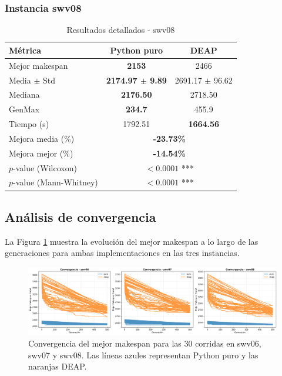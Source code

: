 \documentclass[12pt,a4paper]{article}
\begin{document}
\subsubsection{Instancia swv08}

\begin{table}[H]
\centering
\caption{Resultados detallados - swv08}
\label{tab:swv08}
\begin{tabular}{@{}lcc@{}}
\toprule
\textbf{Métrica} & \textbf{Python puro} & \textbf{DEAP} \\ \midrule
Mejor makespan & \textbf{2153} & 2466 \\
Media $\pm$ Std & \textbf{2174.97 $\pm$ 9.89} & 2691.17 $\pm$ 96.62 \\
Mediana & \textbf{2176.50} & 2718.50 \\
GenMax & \textbf{234.7} & 455.9 \\
Tiempo (s) & 1792.51 & \textbf{1664.56} \\ \midrule
Mejora media (\%) & \multicolumn{2}{c}{\textbf{-23.73\%}} \\
Mejora mejor (\%) & \multicolumn{2}{c}{\textbf{-14.54\%}} \\
$p$-value (Wilcoxon) & \multicolumn{2}{c}{$< 0.0001$ ***} \\
$p$-value (Mann-Whitney) & \multicolumn{2}{c}{$< 0.0001$ ***} \\
\bottomrule
\end{tabular}
\end{table}

\subsection{Análisis de convergencia}

La Figura \ref{fig:convergencia} muestra la evolución del mejor makespan a lo largo de las generaciones para ambas implementaciones en las tres instancias.

\begin{figure}[H]
    \centering
    \includegraphics[width=\textwidth]{Figuras/convergencia_comparativa.png}
    \caption{Convergencia del mejor makespan para las 30 corridas en swv06, swv07 y swv08. Las líneas azules representan Python puro y las naranjas DEAP.}
    \label{fig:convergencia}
\end{figure}
\end{document}
